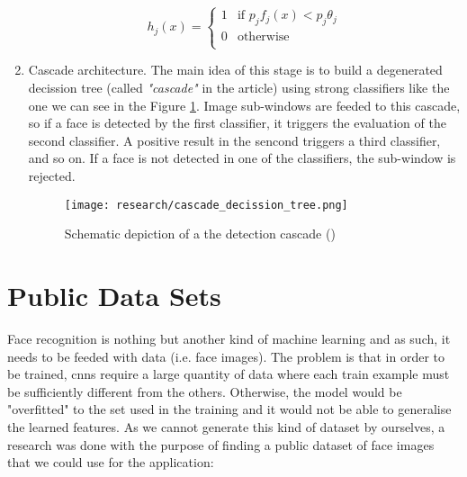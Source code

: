 \begin{enumerate}
		\begin{equation}
			\label{eq:viola_jones_weak_classifier}
			h_j(x)=
				\begin{cases}
			     	1 & \text{if $p_jf_j(x) < p_j\theta_j$} \\
			        0 & \text{otherwise} \\
				\end{cases}
		\end{equation}

		\item Cascade architecture. The main idea of this stage is to build a degenerated decission tree (called \textit{"cascade"} in the article) using strong classifiers like the one we can see in the Figure \ref{fig:cascade_decission_tree}. Image sub-windows are feeded to this cascade, so if a face is detected by the first classifier, it triggers the evaluation of the second classifier. A positive result in the sencond triggers a third classifier, and so on. If a face is not detected in one of the classifiers, the sub-window is rejected. 
		
		\begin{figure}[!ht]
			\centering
			\texttt{[image: research/cascade\_decission\_tree.png]}
			\caption{Schematic depiction of a the detection cascade (\cite{viola2001rapid})}
			\label{fig:cascade_decission_tree}
		\end{figure}
			
	\end{enumerate}


                                                                      

\section{Public Data Sets} 
Face recognition is nothing but another kind of machine learning and as such, it needs to be feeded with data (i.e. face images). The problem is that in order to be trained, \glspl{cnn} require a large quantity of data where each train example must be sufficiently different from the others. Otherwise, the model would be "overfitted" to the set used in the training and it would not be able to generalise the learned features. As we cannot generate this kind of dataset by ourselves, a research was done with the purpose of finding a public dataset of face images that we could use for the application:

